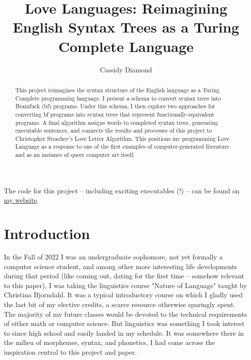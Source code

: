 \documentclass[runningheads]{llncs}
\begin{document}

\title{Love Languages: Reimagining English Syntax Trees as a Turing Complete Language}

\author{
	Cassidy Diamond
}



\maketitle

\begin{abstract}
	This project reimagines the syntax structure of the English language as a Turing Complete programming language. I present a schema to convert syntax trees into Brainfuck (bf) programs. Under this schema, I then explore two approaches for converting bf programs into syntax trees that represent functionally-equivalent programs. A final algorithm assigns words to completed syntax trees, generating executable sentences, and connects the results and processes of this project to Christopher Strachey's Love Letter Algorithm. This positions my programming Love Language as a response to one of the first examples of computer-generated literature and as an instance of queer computer art itself.
\end{abstract}

The code for this project -- including exciting executables (!) -- can be found on \href{https://cassidydiamond.me/love-languages}{my website}. %
\section{Introduction}
In the Fall of 2022 I was an undergraduate sophomore, not yet formally a computer science student, and among other more interesting life developments during that period (like coming out, dating for the first time -- somehow relevant to this paper), I was taking the linguistics course "Nature of Language" taught by Christina Bjorndahl. It was a typical introductory course on which I gladly used the last bit of my elective credits, a scarce resource otherwise sparingly spent. The majority of my future classes would be devoted to the technical requirements of either math or computer science. But linguistics was something I took interest to since high school and easily landed in my schedule. It was somewhere there in the milieu of morphemes, syntax, and phonetics, I had come across the inspiration central to this project and paper.
\end{document}
